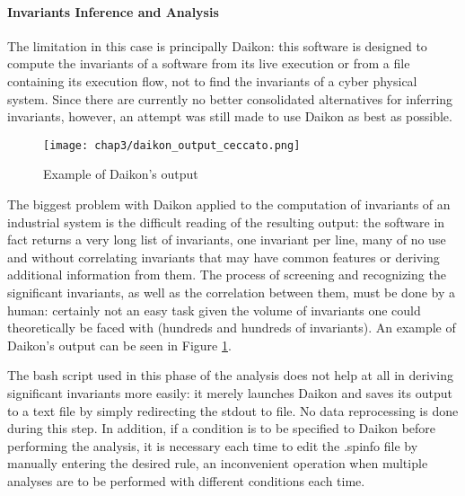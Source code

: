 \paragraph{Invariants Inference and Analysis}
The limitation in this case is principally Daikon: this software is designed to compute the invariants of a software from its live execution or from a file containing its execution flow, not to find the invariants of a cyber physical system. Since there are currently no better consolidated alternatives for inferring invariants, however, an attempt was still made to use Daikon as best as possible.

\begin{figure}[H]
	\centering
	\texttt{[image: chap3/daikon\_output\_ceccato.png]}
	\caption{Example of Daikon's output}
	\label{fig:daikon_output_ceccato}
\end{figure}

The biggest problem with Daikon applied to the computation of invariants of an industrial system is the difficult reading of the resulting output: the software in fact returns a very long list of invariants, one invariant per line, many of no use and without correlating invariants that may have common features or deriving additional information from them. The process of screening and recognizing the significant invariants, as well as the correlation between them, must be done by a human: certainly not an easy task given the volume of invariants one could theoretically be faced with (hundreds and hundreds of invariants). An example of Daikon's output can be seen in Figure \ref{fig:daikon_output_ceccato}.

\bigskip
The bash script used in this phase of the analysis does not help at all in deriving significant invariants more easily: it merely launches Daikon and saves its output to a text file by simply redirecting the stdout to file. No data reprocessing is done during this step. In addition, if a condition is to be specified to Daikon before performing the analysis, it is necessary each time to edit the .spinfo file by manually entering the desired rule, an inconvenient operation when multiple analyses are to be performed with different conditions each time. 

\vfill
\nolinenumbers
